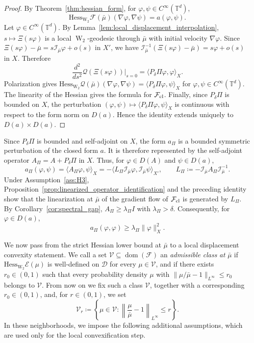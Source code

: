 \documentclass[11pt]{article}
\numberwithin{equation}{section}
\theoremstyle{definition}
\newcommand{\T}{\mathbb{T}}
\newcommand{\F}{\mathcal{F}}
\newcommand{\E}{\mathcal{E}}
\newcommand{\Wtwo}{\operatorname{W}_2}
\newcommand{\rieszmap}[1][\mu]{\mathcal{I}_{#1}}
\begin{document}
\begin{proof}
    By Theorem~\ref{thm:hessian_form}, for $\varphi, \psi \in C^\infty(\T^d)$,
    \[
    \mathrm{Hess}_{\Wtwo}\F(\bar\mu)(\nabla\varphi, \nabla\psi) = a(\varphi,\psi).
    \]
    Let $\varphi \in C^\infty(\T^d)$.
    By Lemma~\ref{lem:local_displacement_interpolation}, $s \mapsto \Xi(s \varphi)$ is a local $\Wtwo$-geodesic through $\bar\mu$ with initial velocity $\nabla \varphi$.
    Since $\Xi(s\varphi) - \bar\mu = s\rieszmap[\bar\mu]\varphi + o(s)$ in $X'$, we have $\rieszmap[\bar\mu]^{-1}(\Xi(s\varphi) - \bar\mu) = s\varphi + o(s)$ in $X$.
    Therefore
    \[
    \frac{d^2}{ds^2} \mathcal{Q}(\Xi(s\varphi)) \Big|_{s=0} = \langle P_\delta \Pi \varphi, \varphi\rangle_X.
    \]
    Polarization gives $\mathrm{Hess}_{\Wtwo} \mathcal{Q}(\bar\mu)(\nabla \varphi, \nabla \psi) = \langle P_\delta \Pi \varphi, \psi\rangle_X$ for $\varphi, \psi \in C^{\infty}(\T^d)$.
    The linearity of the Hessian gives the formula for $\F_{\rm cl}$.
    Finally, since $P_\delta \Pi$ is bounded on $X$, the perturbation $(\varphi,\psi) \mapsto \langle P_\delta \Pi\varphi, \psi\rangle_X$ is continuous with respect to the form norm on $D(a)$.
    Hence the identity extends uniquely to $D(a) \times D(a)$.
\end{proof}

Since $P_\delta \Pi$ is bounded and self-adjoint on $X$, the form $a_\Pi$ is a bounded symmetric perturbation of the closed form $a$.
It is therefore represented by the self-adjoint operator $A_\Pi = A + P_\delta\Pi$ in $X$.
Thus, for $\varphi \in D(A)$ and $\psi \in D(a)$,
\[
a_\Pi(\varphi, \psi) = \langle A_\Pi \varphi, \psi\rangle_X = -\langle L_\Pi \rieszmap[\bar\mu] \varphi, \rieszmap[\bar\mu] \psi \rangle_{X'}, \qquad L_\Pi \coloneqq -\rieszmap[\bar\mu] A_\Pi \rieszmap[\bar\mu]^{-1}.
\]
Under Assumption~\ref{ass:H3}, Proposition~\ref{prop:linearized_operator_identification} and the preceding identity show that the linearization at $\bar\mu$ of the gradient flow of $\F_{\rm cl}$ is generated by $L_\Pi$.
By Corollary~\ref{cor:spectral_gap}, $A_\Pi \ge \lambda_\Pi I$ with $\lambda_\Pi > \delta$.
Consequently, for $\varphi \in D(a)$,
\[
a_\Pi(\varphi, \varphi) \ge \lambda_\Pi\|\varphi\|_X^2.
\]

We now pass from the strict Hessian lower bound at $\bar\mu$ to a local displacement convexity statement.
We call a set $\mathcal{V} \subseteq \operatorname{dom}(\F)$ an \emph{admissible class at $\bar\mu$} if $\mathrm{Hess}_{\Wtwo}\E(\mu)$ is well-defined on $\mathscr{D}$ for every $\mu \in \mathcal{V}$, and if there exists $r_0 \in (0,1)$ such that every probability density $\mu$ with $\|\mu/\bar\mu - 1\|_{L^\infty} \le r_0$ belongs to $\mathcal{V}$.
From now on we fix such a class $\mathcal{V}$, together with a corresponding $r_0 \in (0,1)$, and, for $r \in (0,1)$, we set
\[
\mathcal{V}_r \coloneqq \left\{\mu \in \mathcal{V} : \left\|\frac{\mu}{\bar\mu} - 1\right\|_{L^\infty} \le r \right\}.
\]
In these neighborhoods, we impose the following additional assumptions, which are used only for the local convexification step.
\end{document}
